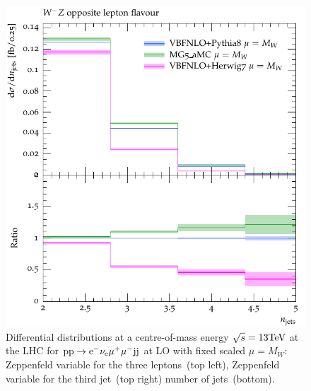 \documentclass[11pt]{cernrep}
\begin{document}
\begin{figure}[htbp]
\begin{center}
   \includegraphics[scale=0.5]{figs/VBFNLO_WmZ_OF_nJets}
\caption{Differential distributions at a centre-of-mass energy $\sqrt{s}=13{\rm TeV}$ at the LHC for ${\rm p} {\rm p}
  \to {\rm e}^-  \nu_{\rm e}  \mu^+ \mu^- {\rm j} {\rm j}$ at LO with fixed scaled $\mu = M_W$: 
                Zeppenfeld variable for the three leptons~(top left),
                Zeppenfeld variable for the third jet~(top right)
                number of jets~(bottom).}
\label{vbs_fig_shower_1b}
\end{center}
\end{figure}
\end{document}
